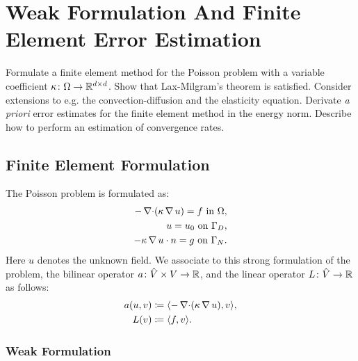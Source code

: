 
\chapter[Poisson Equation]{Weak Formulation And Finite Element Error Estimation}

\begin{problem_text}
    Formulate a finite element method for the Poisson problem with a variable
    coefficient \( \kappa \colon \Omega \to \mathbb{R}^{d\times d}\). Show that
    Lax-Milgram's theorem is satisfied. Consider extensions to e.g. the
    convection-diffusion and the elasticity equation. Derivate \emph{a priori}
    error estimates for the finite element method in the energy norm. Describe
    how to perform an estimation of convergence rates.
\end{problem_text}

\section{Finite Element Formulation}

The Poisson problem is formulated as:
\begin{align}
    -\operatorname{\nabla \cdot} (\kappa \operatorname{\nabla} u) = f \text { in } \Omega,\\
    u = u_0 \text{ on } \Gamma_D,\\
    -\kappa \operatorname{\nabla} u \cdot n = g \text{ on } \Gamma_N.
\end{align}
Here \( u \) denotes the unknown field. We associate to this strong formulation
of the problem, the bilinear operator \( a\colon \hat{V} \times V \to \mathbb{R}\),
and the linear operator \( L \colon \hat{V} \to \mathbb{R}\) as follows:
\begin{align}
    a(u, v) &\coloneqq \langle -\operatorname{\nabla \cdot}(\kappa \operatorname{\nabla} u), v \rangle, \\
    L(v) &\coloneqq \langle f, v \rangle.
\end{align}

\subsection{Weak Formulation}
\label{sub:weak_formulation}

